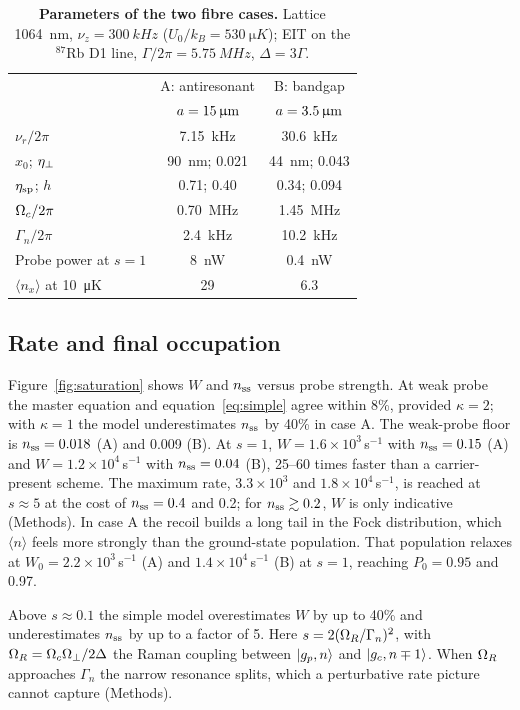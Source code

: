 \documentclass[10pt,twocolumn,a4paper]{article}
\begin{document}
\begin{table}[t]
\caption{\textbf{Parameters of the two fibre cases.} Lattice \SI{1064}{nm}, $\nu_z=\SI{300}{kHz}$ ($U_0/k_B=\SI{530}{\micro K}$); EIT on the $^{87}$Rb D1 line, $\Gamma/2\pi=\SI{5.75}{MHz}$, $\Delta=3\Gamma$.}
\label{tab:params}
\centering\footnotesize\sffamily
\begin{tabular}{@{}lcc@{}}
\toprule
& A: antiresonant & B: bandgap\\
& $a=15\,\upmu\mathrm{m}$ & $a=3.5\,\upmu\mathrm{m}$\\
\midrule
$\nu_r/2\pi$ & \SI{7.15}{kHz} & \SI{30.6}{kHz}\\
$x_0$; $\eta_{\perp}$ & \SI{90}{nm}; 0.021 & \SI{44}{nm}; 0.043\\
$\eta_{\rm sp}$; $h$ & 0.71; 0.40 & 0.34; 0.094\\
$\Omega_c/2\pi$ & \SI{0.70}{MHz} & \SI{1.45}{MHz}\\
$\Gamma_n/2\pi$ & \SI{2.4}{kHz} & \SI{10.2}{kHz}\\
Probe power at $s=1$ & \SI{8}{nW} & \SI{0.4}{nW}\\
$\langle n_x\rangle$ at \SI{10}{\micro K} & 29 & 6.3\\
\bottomrule
\end{tabular}
\end{table}

\subsection{Rate and final occupation}
Figure~\ref{fig:saturation} shows $W$ and $n_{\rm ss}$ versus probe strength. At weak probe the master equation and equation~\eqref{eq:simple} agree within 8\%, provided $\kappa=2$; with $\kappa=1$ the model underestimates $n_{\rm ss}$ by 40\% in case A. The weak-probe floor is $n_{\rm ss}=0.018$ (A) and 0.009 (B). At $s=1$, $W=1.6\times10^3$\,s$^{-1}$ with $n_{\rm ss}=0.15$ (A) and $W=1.2\times10^4$\,s$^{-1}$ with $n_{\rm ss}=0.04$ (B), 25--60 times faster than a carrier-present scheme. The maximum rate, $3.3\times10^3$ and $1.8\times10^4$\,s$^{-1}$, is reached at $s\approx5$ at the cost of $n_{\rm ss}=0.4$ and 0.2; for $n_{\rm ss}\gtrsim0.2$, $W$ is only indicative (Methods). In case A the recoil builds a long tail in the Fock distribution, which $\langle n\rangle$ feels more strongly than the ground-state population. That population relaxes at $W_0=2.2\times10^3$\,s$^{-1}$ (A) and $1.4\times10^4$\,s$^{-1}$ (B) at $s=1$, reaching $P_0=0.95$ and 0.97.

Above $s\approx0.1$ the simple model overestimates $W$ by up to 40\% and underestimates $n_{\rm ss}$ by up to a factor of 5. Here $s=2(\Omega_R/\Gamma_n)^2$, with $\Omega_R=\Omega_c\Omega_\perp/2\Delta$ the Raman coupling between $|g_p,n\rangle$ and $|g_c,n\mp1\rangle$. When $\Omega_R$ approaches $\Gamma_n$ the narrow resonance splits, which a perturbative rate picture cannot capture (Methods).
\end{document}
